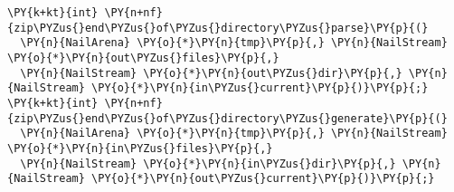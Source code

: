 \begin{Verbatim}[commandchars=\\\{\},codes={\catcode`\$=3\catcode`\^=7\catcode`\_=8}]
\PY{k+kt}{int} \PY{n+nf}{zip\PYZus{}end\PYZus{}of\PYZus{}directory\PYZus{}parse}\PY{p}{(}
  \PY{n}{NailArena} \PY{o}{*}\PY{n}{tmp}\PY{p}{,} \PY{n}{NailStream} \PY{o}{*}\PY{n}{out\PYZus{}files}\PY{p}{,}
  \PY{n}{NailStream} \PY{o}{*}\PY{n}{out\PYZus{}dir}\PY{p}{,} \PY{n}{NailStream} \PY{o}{*}\PY{n}{in\PYZus{}current}\PY{p}{)}\PY{p}{;}
\PY{k+kt}{int} \PY{n+nf}{zip\PYZus{}end\PYZus{}of\PYZus{}directory\PYZus{}generate}\PY{p}{(}
  \PY{n}{NailArena} \PY{o}{*}\PY{n}{tmp}\PY{p}{,} \PY{n}{NailStream} \PY{o}{*}\PY{n}{in\PYZus{}files}\PY{p}{,}
  \PY{n}{NailStream} \PY{o}{*}\PY{n}{in\PYZus{}dir}\PY{p}{,} \PY{n}{NailStream} \PY{o}{*}\PY{n}{out\PYZus{}current}\PY{p}{)}\PY{p}{;}
\end{Verbatim}
